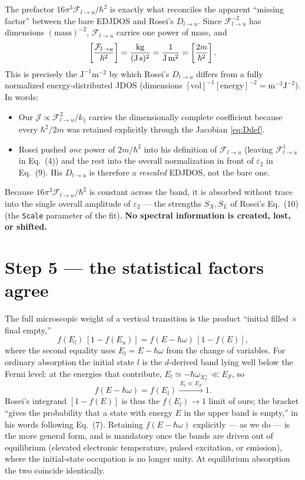 \documentclass[11pt]{article}
\newcommand{\kpar}{k_{\parallel}}
\newcommand{\hw}{\hbar\omega}
\newcommand{\Flu}{\mathcal{F}_{l\to u}}
\newcommand{\Jc}{\mathcal{J}}
\newcommand{\Dlu}{D_{l\to u}}
\newcommand{\wXseven}{\hbar\omega_{X_7^+}}
\newcommand{\Rq}[1]{\textcolor{roseicol}{\textnormal{(#1)}}}
\begin{document}
The prefactor $16\pi^3\Flu/\hbar^2$ is exactly what reconciles the apparent
``missing factor'' between the bare EDJDOS and Rosei's $\Dlu$. Since
$\Flu^{-2}$ has dimensions $(\text{mass})^{-2}$, $\Flu$ carries one power of mass, and
%
\begin{equation}
\left[\frac{\Flu}{\hbar^{2}}\right]
=\frac{\text{kg}}{(\text{J\,s})^{2}}=\frac{1}{\text{J}\,\text{m}^{2}}
=\left[\frac{2m}{\hbar^{2}}\right].
\label{eq:units}
\end{equation}
%
This is precisely the $\text{J}^{-1}\text{m}^{-2}$ by which Rosei's $\Dlu$ differs from a
fully normalized energy-distributed JDOS (dimensions
$[\text{vol}]^{-1}[\text{energy}]^{-2}=\text{m}^{-3}\text{J}^{-2}$). In words:
%
\begin{itemize}
\item Our $\Jc\propto\Flu^{2}/\kpar$ carries the dimensionally complete coefficient
      because every $\hbar^2/2m$ was retained explicitly through the Jacobian
      \eqref{eq:Ddef}.
\item Rosei pushed \emph{one} power of $2m/\hbar^2$ into his definition of $\Flu$ (leaving
      $\Flu^{1}$ in Eq.~\Rq{4}) and the rest into the overall normalization in front of
      $\varepsilon_2$ in Eq.~\Rq{9}. His $\Dlu$ is therefore a \emph{rescaled} EDJDOS,
      not the bare one.
\end{itemize}
%
Because $16\pi^3\Flu/\hbar^2$ is constant across the band, it is absorbed without trace
into the single overall amplitude of $\varepsilon_2$ --- the strengths $S_X,S_L$ of
Rosei's Eq.~\Rq{10} (the \texttt{Scale} parameter of the fit). \textbf{No spectral
information is created, lost, or shifted.}

\section{Step 5 --- the statistical factors agree}
\label{sec:occupation}

The full microscopic weight of a vertical transition is the product
``initial filled $\times$ final empty,''
%
\begin{equation}
f(E_l)\,[1-f(E_u)]=f(E-\hw)\,[1-f(E)],
\end{equation}
%
where the second equality uses $E_l=E-\hw$ from the change of variables. For ordinary
absorption the initial state $l$ is the $d$-derived band lying well below the Fermi
level: at the energies that contribute, $E_l\simeq-\wXseven\ll E_F$, so
%
\begin{equation}
f(E-\hw)=f(E_l)\xrightarrow{\,E_l\ll E_F\,}1 .
\end{equation}
%
Rosei's integrand $[1-f(E)]$ is thus the $f(E_l)\to1$ limit of ours; the bracket
``gives the probability that a state with energy $E$ in the upper band is empty,'' in his
words following Eq.~\Rq{7}. Retaining $f(E-\hw)$ explicitly --- as we do --- is the more
general form, and is mandatory once the bands are driven out of equilibrium (elevated
electronic temperature, pulsed excitation, or emission), where the initial-state
occupation is no longer unity. At equilibrium absorption the two coincide identically.
\end{document}
